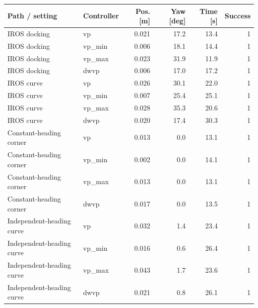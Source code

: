 \begin{tabular}{llrrrr}
\hline
Path / setting & Controller & Pos. [m] & Yaw [deg] & Time [s] & Success \\
\hline
IROS docking & vp & 0.021 & 17.2 & 13.4 & 1 \\
IROS docking & vp\_min & 0.006 & 18.1 & 14.4 & 1 \\
IROS docking & vp\_max & 0.023 & 31.9 & 11.9 & 1 \\
IROS docking & dwvp & 0.006 & 17.0 & 17.2 & 1 \\
IROS curve & vp & 0.026 & 30.1 & 22.0 & 1 \\
IROS curve & vp\_min & 0.007 & 25.4 & 25.1 & 1 \\
IROS curve & vp\_max & 0.028 & 35.3 & 20.6 & 1 \\
IROS curve & dwvp & 0.020 & 17.4 & 30.3 & 1 \\
Constant-heading corner & vp & 0.013 & 0.0 & 13.1 & 1 \\
Constant-heading corner & vp\_min & 0.002 & 0.0 & 14.1 & 1 \\
Constant-heading corner & vp\_max & 0.013 & 0.0 & 13.1 & 1 \\
Constant-heading corner & dwvp & 0.017 & 0.0 & 13.5 & 1 \\
Independent-heading curve & vp & 0.032 & 1.4 & 23.4 & 1 \\
Independent-heading curve & vp\_min & 0.016 & 0.6 & 26.4 & 1 \\
Independent-heading curve & vp\_max & 0.043 & 1.7 & 23.6 & 1 \\
Independent-heading curve & dwvp & 0.021 & 0.8 & 26.1 & 1 \\
\hline
\end{tabular}
